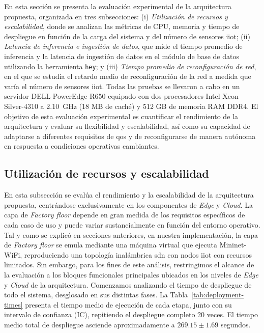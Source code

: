 En esta sección se presenta la evaluación experimental de la arquitectura propuesta, organizada en tres subsecciones: (i) \emph{Utilización de recursos y escalabilidad}, donde se analizan las métricas de CPU, memoria y tiempo de despliegue en función de la carga del sistema y del número de sensores \gls{iiot}; (ii) \emph{Latencia de inferencia e ingestión de datos}, que mide el tiempo promedio de inferencia y la latencia de ingestión de datos en el módulo de base de datos utilizando la herramienta \texttt{hey}; y (iii) \emph{Tiempo promedio de reconfiguración de red}, en el que se estudia el retardo medio de reconfiguración de la red a medida que varía el número de sensores \gls{iiot}. Todas las pruebas se llevaron a cabo en un servidor DELL PowerEdge R650 equipado con dos procesadores Intel Xeon Silver-4310 a 2.10~GHz (18 MB de caché) y 512 GB de memoria RAM DDR4. El objetivo de esta evaluación experimental es cuantificar el rendimiento de la arquitectura y evaluar su flexibilidad y escalabilidad, así como su capacidad de adaptarse a diferentes requisitos de \gls{qos} y de reconfigurarse de manera autónoma en respuesta a condiciones operativas cambiantes.     

\subsection{Utilización de recursos y escalabilidad}

En esta subsección se evalúa el rendimiento y la escalabilidad de la arquitectura propuesta, centrándose exclusivamente en los componentes de \textit{Edge} y \textit{Cloud}. La capa de \textit{Factory floor} depende en gran medida de los requisitos específicos de cada caso de uso y puede variar sustancialmente en función del entorno operativo. Tal y como se explicó en secciones anteriores, en nuestra implementación, la capa de \textit{Factory floor} se emula mediante una máquina virtual que ejecuta Mininet-WiFi, reproduciendo una topología inalámbrica \gls{sdn} con nodos \gls{iiot} con recursos limitados. Sin embargo, para los fines de este análisis, restringimos el alcance de la evaluación a los bloques funcionales principales ubicados en los niveles de \textit{Edge} y \textit{Cloud} de la arquitectura. Comenzamos analizando el tiempo de despliegue de todo el sistema, desglosado en sus distintas fases. La Tabla~\ref{tab:deployment-times} presenta el tiempo medio de ejecución de cada etapa, junto con su intervalo de confianza (IC), repitiendo el despliegue completo 20 veces. El tiempo medio total de despliegue asciende aproximadamente a $269.15 \pm 1.69$ segundos.


